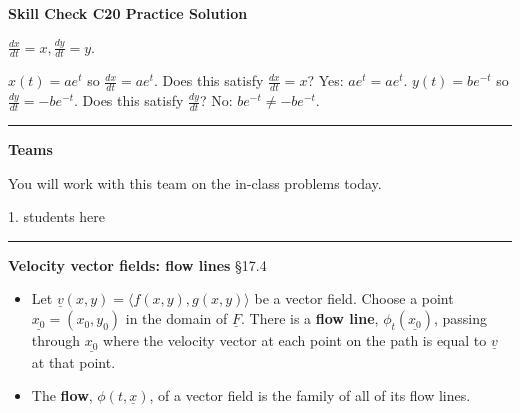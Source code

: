 \documentclass[12pt,letterpaper,noanswers]{exam}
\newcommand{\mb}[1]{\underline{#1}}
\begin{document}
\noindent\textbf{Skill Check C20 Practice Solution}
\begin{questions}
\question 
\begin{parts}
\item $\frac{dx}{dt} = x, \frac{dy}{dt} = y$.
\item $x(t) = ae^t$ so $\frac{dx}{dt} = ae^t$.  Does this satisfy $\frac{dx}{dt} = x$?  Yes: $ae^t=ae^t$.  $y(t) = be^{-t}$ so $\frac{dy}{dt} = -be^{-t}$.  Does this satisfy $\frac{dy}{dt}$?  No: $be^{-t} \neq -be^{-t}$.
\end{parts}
\end{questions}

\vspace{0.2cm}
\hrule
\vspace{0.2cm}

\noindent\textbf{Teams}

You will work with this team on the in-class problems today.
\begin{multicols}{2}

1.  students here

\end{multicols}

\hrule
\vspace{0.2cm}


\noindent\textbf{Velocity vector fields: flow lines} \S 17.4
\begin{tcolorbox}
\begin{itemize}
\itemsep0em
    \item Let $\mb v(x,y) = \langle f(x,y), g(x,y)\rangle$ be a vector field.  Choose a point $\mb{x_0} = (x_0,y_0)$ in the domain of $\mb F$.  There is a \textbf{flow line}, $\phi_t(\mb{x_0})$, passing through $\mb{x_0}$ where the velocity vector at each point on the path is equal to $\mb v$ at that point.
    \item The \textbf{flow}, $\phi(t,\mb{x})$, of a vector field is the family of all of its flow lines.
\end{itemize}
\end{tcolorbox}
\end{document}
